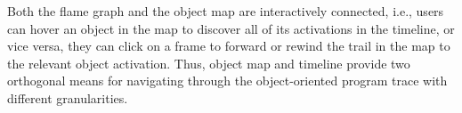 Both the flame graph and the object map are interactively connected, i.e., users can hover an object in the map to discover all of its activations in the timeline, or vice versa, they can click on a frame to forward or rewind the trail in the map to the relevant object activation.
Thus, object map and timeline provide two orthogonal means for navigating through the object-oriented program trace with different granularities.
